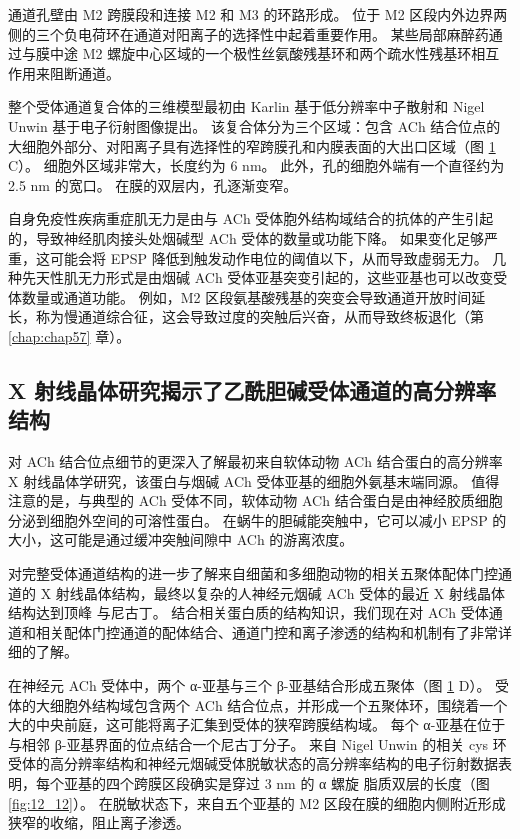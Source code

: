 \begin{figure}[htbp]
	\label{fig:12_11}
\end{figure}


通道孔壁由 M2 跨膜段和连接 M2 和 M3 的环路形成。 
位于 M2 区段内外边界两侧的三个负电荷环在通道对阳离子的选择性中起着重要作用。 
某些局部麻醉药通过与膜中途 M2 螺旋中心区域的一个极性丝氨酸残基环和两个疏水性残基环相互作用来阻断通道。


整个受体通道复合体的三维模型最初由 Karlin 基于低分辨率中子散射和 Nigel Unwin 基于电子衍射图像提出。 
该复合体分为三个区域：包含 ACh 结合位点的大细胞外部分、对阳离子具有选择性的窄跨膜孔和内膜表面的大出口区域（图 \ref{fig:12_11} C）。 
细胞外区域非常大，长度约为 6 nm。 
此外，孔的细胞外端有一个直径约为 2.5 nm 的宽口。 
在膜的双层内，孔逐渐变窄。


自身免疫性疾病重症肌无力是由与 ACh 受体胞外结构域结合的抗体的产生引起的，导致神经肌肉接头处烟碱型 ACh 受体的数量或功能下降。 
如果变化足够严重，这可能会将 EPSP 降低到触发动作电位的阈值以下，从而导致虚弱无力。 
几种先天性肌无力形式是由烟碱 ACh 受体亚基突变引起的，这些亚基也可以改变受体数量或通道功能。 
例如，M2 区段氨基酸残基的突变会导致通道开放时间延长，称为慢通道综合征，这会导致过度的突触后兴奋，从而导致终板退化（第 \ref{chap:chap57} 章）。



\subsection{X 射线晶体研究揭示了乙酰胆碱受体通道的高分辨率结构}

对 ACh 结合位点细节的更深入了解最初来自软体动物 ACh 结合蛋白的高分辨率 X 射线晶体学研究，该蛋白与烟碱 ACh 受体亚基的细胞外氨基末端同源。 
值得注意的是，与典型的 ACh 受体不同，软体动物 ACh 结合蛋白是由神经胶质细胞分泌到细胞外空间的可溶性蛋白。 
在蜗牛的胆碱能突触中，它可以减小 EPSP 的大小，这可能是通过缓冲突触间隙中 ACh 的游离浓度。


对完整受体通道结构的进一步了解来自细菌和多细胞动物的相关五聚体配体门控通道的 X 射线晶体结构，最终以复杂的人神经元烟碱 ACh 受体的最近 X 射线晶体结构达到顶峰 与尼古丁。 
结合相关蛋白质的结构知识，我们现在对 ACh 受体通道和相关配体门控通道的配体结合、通道门控和离子渗透的结构和机制有了非常详细的了解。


在神经元 ACh 受体中，两个 α-亚基与三个 β-亚基结合形成五聚体（图 \ref{fig:12_11} D）。 
受体的大细胞外结构域包含两个 ACh 结合位点，并形成一个五聚体环，围绕着一个大的中央前庭，这可能将离子汇集到受体的狭窄跨膜结构域。 
每个 α-亚基在位于与相邻 β-亚基界面的位点结合一个尼古丁分子。 
来自 Nigel Unwin 的相关 cys 环受体的高分辨率结构和神经元烟碱受体脱敏状态的高分辨率结构的电子衍射数据表明，每个亚基的四个跨膜区段确实是穿过 3 nm 的 α 螺旋 脂质双层的长度（图 \ref{fig:12_12}）。 
在脱敏状态下，来自五个亚基的 M2 区段在膜的细胞内侧附近形成狭窄的收缩，阻止离子渗透。


